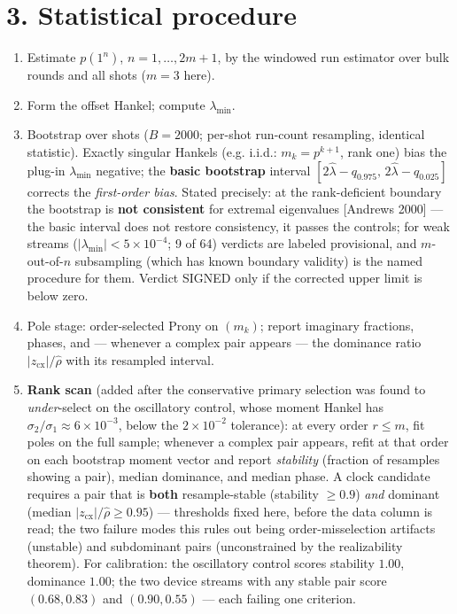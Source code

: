 \documentclass[11pt]{article}
\begin{document}
\section*{3. Statistical procedure}
\begin{enumerate}
\item Estimate $p(1^n)$, $n = 1, \ldots, 2m{+}1$, by the windowed run estimator over bulk rounds and all shots ($m = 3$ here).
\item Form the offset Hankel; compute $\lambda_{\min}$.
\item Bootstrap over shots ($B = 2000$; per-shot run-count resampling, identical statistic).  Exactly singular Hankels (e.g. i.i.d.: $m_k = p^{k+1}$, rank one) bias the plug-in $\lambda_{\min}$ negative; the \textbf{basic bootstrap} interval $[2\hat\lambda - q_{0.975},\, 2\hat\lambda - q_{0.025}]$ corrects the \emph{first-order bias}.  Stated precisely: at the rank-deficient boundary the bootstrap is \textbf{not consistent} for extremal eigenvalues [Andrews 2000] — the basic interval does not restore consistency, it passes the controls; for weak streams ($|\lambda_{\min}| < 5\times 10^{-4}$; 9 of 64) verdicts are labeled provisional, and $m$-out-of-$n$ subsampling (which has known boundary validity) is the named procedure for them. Verdict SIGNED only if the corrected upper limit is below zero.
\item Pole stage: order-selected Prony on $(m_k)$; report imaginary fractions, phases, and — whenever a complex pair appears — the dominance ratio $|z_{\mathrm{cx}}|/\hat\rho$ with its resampled interval.
\item \textbf{Rank scan} (added after the conservative primary selection was found to \emph{under}-select on the oscillatory control, whose moment Hankel has $\sigma_2/\sigma_1 \approx 6\times 10^{-3}$, below the $2\times 10^{-2}$ tolerance): at every order $r \le m$, fit poles on the full sample; whenever a complex pair appears, refit at that order on each bootstrap moment vector and report \emph{stability} (fraction of resamples showing a pair), median dominance, and median phase.  A clock candidate requires a pair that is \textbf{both} resample-stable (stability $\ge 0.9$) \emph{and} dominant (median $|z_{\mathrm{cx}}|/\hat\rho \ge 0.95$) — thresholds fixed here, before the data column is read; the two failure modes this rules out being order-misselection artifacts (unstable) and subdominant pairs (unconstrained by the realizability theorem).  For calibration: the oscillatory control scores stability $1.00$, dominance $1.00$; the two device streams with any stable pair score $(0.68, 0.83)$ and $(0.90, 0.55)$ — each failing one criterion.
\end{enumerate}
\end{document}
